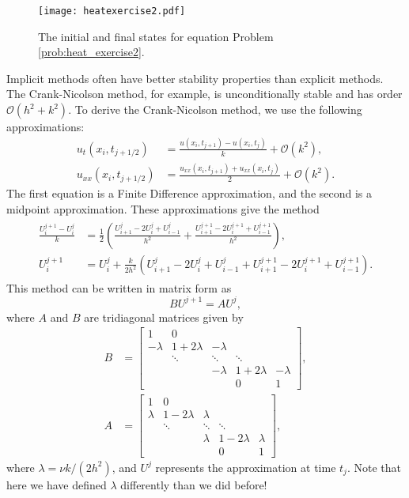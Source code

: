 \begin{figure}
\centering
\texttt{[image: heatexercise2.pdf]}
\caption{The initial and final states for equation Problem \ref{prob:heat_exercise2}.}
\label{fig:heatexercise2}
\end{figure}

Implicit methods often have better stability properties than explicit methods.
The Crank-Nicolson method, for example, is unconditionally stable and has order $\mathcal{O}(h^2 + k^2)$.
To derive the Crank-Nicolson method, we use the following approximations:
\begin{align*}
	u_t(x_i,t_{j+1/2}) &= \frac{u(x_i,t_{j+1}) - u(x_i,t_j)}{k} + \mathcal{O}(k^2), \\
	u_{xx}(x_i,t_{j+1/2}) &= \frac{u_{xx}(x_i,t_{j+1}) + u_{xx}(x_i,t_j)}{2} + \mathcal{O}(k^2).
\end{align*}
The first equation is a Finite Difference approximation, and the second is a midpoint approximation. These approximations give the method
\begin{align}
	\begin{split}
	\frac{U^{j+1}_i - U^j_i}{k} &= \frac{1}{2}\left( \frac{U^j_{i+1} - 2U^j_{i} + U^j_{i-1}}{h^2} + \frac{U^{j+1}_{i+1} - 2U^{j+1}_{i} + U^{j+1}_{i-1}}{h^2}  \right) ,\\
	U^{j+1}_i  &= U^j_i + \frac{k}{2h^2} \left( U^j_{i+1} - 2U^j_{i} + U^j_{i-1} + U^{j+1}_{i+1} - 2U^{j+1}_{i} + U^{j+1}_{i-1}   \right).
\end{split}
\end{align}
This method can be written in matrix form as
\[BU^{j+1} = A U^j,\]
where $A$ and $B$ are tridiagonal matrices given by
\begin{align*}
B &= \left[\begin{array}{cccccc}1 & 0 &  &  &  \\ -\lambda & 1+2\lambda &  -\lambda & &  \\ &  \ddots &   \ddots & \ddots \\ & &  -\lambda &  1+2\lambda & -\lambda \\ &  &  & 0 & 1\end{array}\right], \\
A &= \left[\begin{array}{cccccc}1 & 0 &  &  &  \\ \lambda & 1-2\lambda &  \lambda & &  \\ &  \ddots &   \ddots & \ddots \\ & &  \lambda &  1-2\lambda & \lambda \\ &  &  & 0 & 1\end{array}\right],
\end{align*}
where $\lambda = \nu k/(2h^2)$, and $U^j$ represents the approximation at time $t_j$.
Note that here we have defined $\lambda$ differently than we did before!

